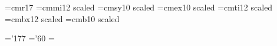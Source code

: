 \def\xivpt{\ifmmode\err@badsizechange\else
     \@mathfontinit
     \textfont0=\xivptrm  \scriptfont0=\xptrm  \scriptscriptfont0=\viiptrm
     \textfont1=\xivptmit \scriptfont1=\xptmit \scriptscriptfont1=\viiptmit
     \textfont2=\xivptsy  \scriptfont2=\xptsy  \scriptscriptfont2=\viiptsy
     \textfont3=\xivptex  \scriptfont3=\xptex  \scriptscriptfont3=\xptex
     \textfont\itfam=\xivptit
     \scriptfont\itfam=\xptit
     \scriptscriptfont\itfam=\viiptit
     \textfont\bffam=\xivptbf
     \scriptfont\bffam=\xptbf
     \scriptscriptfont\bffam=\viiptbf
     \textfont\bfsfam=\xivptbfs
     \scriptfont\bfsfam=\xptbfs
     \scriptscriptfont\bfsfam=\viiptbf
     \textfont\bmitfam=\xivptbmit
     \scriptfont\bmitfam=\xptbmit
     \scriptscriptfont\bmitfam=\viiptmit
     \@fontstyleinit
     \def\rm{\xivptrm\fam=\z@}%
     \def\it{\xivptit\fam=\itfam}%
     \def\sl{\xivptsl}%
     \def\bf{\xivptbf\fam=\bffam}%
     \def\tt{\xivpttt}%
     \def\ss{\xivptss}%
     \def\sc{\xivptsc}%
     \def\bfs{\xivptbfs\fam=\bfsfam}%
     \def\bmit{\fam=\bmitfam}%
     \def\oldstyle{\xivptmit\fam=\@ne}%
     \rm\fi}


\font\xviiptrm=cmr17
\font\xviiptmit=cmmi12 scaled
\font\xviiptsy=cmsy10 scaled
\font\xviiptex=cmex10 scaled
\font\xviiptit=cmti12 scaled
\font\xviiptbf=cmbx12 scaled
\font\xviiptbfs=cmb10 scaled

\skewchar\xviiptmit='177 \skewchar\xviiptsy='60
 \xviiptsy=\the{} \xviiptsy

\def\xviipt{\ifmmode\err@badsizechange\else
     \@mathfontinit
     \textfont0=\xviiptrm  \scriptfont0=\xiiptrm  \scriptscriptfont0=\viiiptrm
     \textfont1=\xviiptmit \scriptfont1=\xiiptmit \scriptscriptfont1=\viiiptmit
     \textfont2=\xviiptsy  \scriptfont2=\xiiptsy  \scriptscriptfont2=\viiiptsy
     \textfont3=\xviiptex  \scriptfont3=\xiiptex  \scriptscriptfont3=\xptex
     \textfont\itfam=\xviiptit
     \scriptfont\itfam=\xiiptit
     \scriptscriptfont\itfam=\viiiptit
     \textfont\bffam=\xviiptbf
     \scriptfont\bffam=\xiiptbf
     \scriptscriptfont\bffam=\viiiptbf
     \textfont\bfsfam=\xviiptbfs
     \scriptfont\bfsfam=\xiiptbfs
     \scriptscriptfont\bfsfam=\viiiptbf
     \@fontstyleinit
     \def\rm{\xviiptrm\fam=\z@}%
     \def\it{\xviiptit\fam=\itfam}%
     \def\bf{\xviiptbf\fam=\bffam}%
     \def\bfs{\xviiptbfs\fam=\bfsfam}%
     \def\oldstyle{\xviiptmit\fam=\@ne}%
     \rm\fi}

